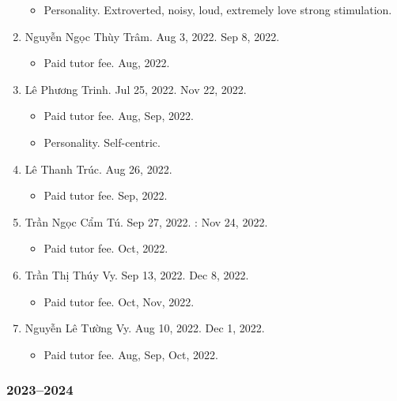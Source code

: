 \documentclass{article}
\begin{document}
\begin{enumerate}
\begin{itemize}
		\item {\sf Personality.} Extroverted, noisy, loud, extremely love strong stimulation.
	\end{itemize}
	\item {\sc Nguyễn Ngọc Thùy Trâm.} {\sf[In]} Aug 3, 2022. {\sf[Out]} Sep 8, 2022.
	\begin{itemize}
		\item {\sf Paid tutor fee.} Aug, 2022.
	\end{itemize}
	\item {\sc Lê Phương Trinh.} {\sf[In]} Jul 25, 2022. {\sf[Out]} Nov 22, 2022.
	\begin{itemize}
		\item {\sf Paid tutor fee.} Aug, Sep, 2022.
		\item {\sf Personality.} Self-centric.
	\end{itemize}
	\item {\sc Lê Thanh Trúc.} {\sf[In]} Aug 26, 2022. {\sf[Out]}
	\begin{itemize}
		\item {\sf Paid tutor fee.} Sep, 2022.
	\end{itemize}
	\item {\sc Trần Ngọc Cẩm Tú.} {\sf[In]} Sep 27, 2022. {}: Nov 24, 2022.
	\begin{itemize}
		\item {\sf Paid tutor fee.} Oct, 2022.
	\end{itemize}
	\item {\sc Trần Thị Thúy Vy.} {\sf[In]} Sep 13, 2022. {\sf[Out]} Dec 8, 2022.
	\begin{itemize}
		\item {\sf Paid tutor fee.} Oct, Nov, 2022.
	\end{itemize}
	\item {\sc Nguyễn Lê Tường Vy.} {\sf[In]} Aug 10, 2022. {\sf[Out]} Dec 1, 2022.
	\begin{itemize}
		\item {\sf Paid tutor fee.} Aug, Sep, Oct, 2022.
	\end{itemize}
\end{enumerate}

\subsubsection{2023--2024}
\end{document}
